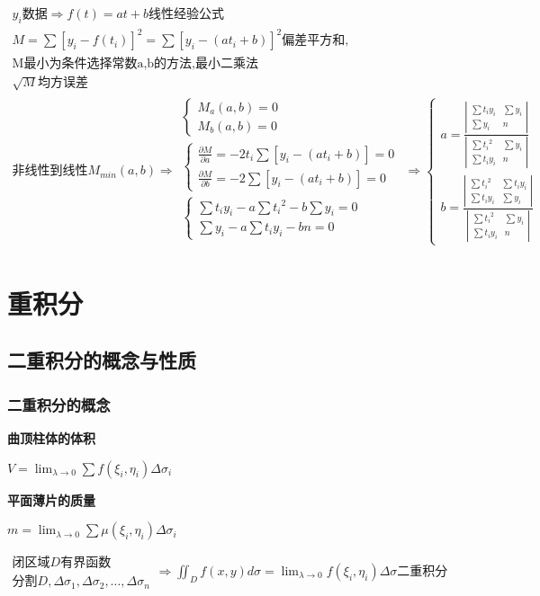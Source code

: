 \documentclass[UTF8]{ctexart}
\newcommand{\mt}[1]{\text{#1}}
\newcommand{\mb}[1]{\textbf{#1}}
\newcommand{\mf}[1]{\left( #1\right)}
\newcommand{\mfc}[1]{\left[ #1 \right]}
\newcommand{\p}{\par}
\newcommand{\ma}[1]{\begin{array}{llll} #1 \end{array}}
\newcommand{\da}[2]{\frac{\partial #1}{\partial #2}}
\newcommand{\fcz}[1] {
    \left\{
        \begin{array}{llll} #1 \end{array}
    \right.
}
\newcommand{\hls}[1] {
    \left|
        \begin{array}{llll} #1 \end{array}
    \right|
}
\begin{document}
$\ma{
y_i \mt{数据} \Rightarrow f\mf{t}=at+b \mt{线性经验公式}\\
M=\sum\mfc{y_i-f\mf{t_i}}^2=\sum\mfc{y_i- \mf{at_i+b }}^2\mt{偏差平方和,}\\
\mt{M最小为条件选择常数a,b的方法,最小二乘法}\\
\sqrt{M}\mt{均方误差}\\
\mt{非线性到线性}
M_{min}\mf{a,b} \Rightarrow  \ma { 
\fcz{
        M_{a}\mf{a,b}=0\\
        M_{b}\mf{a,b}=0
} \\   
\fcz{
    \da{M}{a}=-2t_i\sum\mfc{y_i- \mf{at_i+b} }=0\\
    \da{M}{b}=-2\sum\mfc{y_i- \mf{at_i+b} }=0
} \\   
\fcz{
    \sum t_iy_i-a\sum {t_i}^2-b\sum y_i=0\\
    \sum y_i-a\sum t_iy_i -bn=0
}\\
}\Rightarrow \fcz{
    a=\frac{\hls{
         \sum t_iy_i &  \sum y_i\\
         \sum y_i  & n
    }}{\hls{
         \sum {t_i}^2 &  \sum y_i\\
         \sum t_iy_i  & n
    }} \\
    b=\frac{\hls{
         \sum {t_i}^2 &  \sum t_iy_i\\
         \sum t_iy_i  & \sum y_i
    }}{\hls{
         \sum {t_i}^2 &  \sum y_i\\
         \sum t_iy_i  & n
    }}
}
}$



\newpage
\section{重积分}

\subsection{二重积分的概念与性质}

\subsubsection{二重积分的概念}

\mb{曲顶柱体的体积}\p
$V=\lim_{\lambda \rightarrow 0}\sum f\mf{\xi_i,\eta_i}\Delta \sigma _i$\p

\mb{平面薄片的质量}\p
$m=\lim_{\lambda \rightarrow 0}\sum \mu\mf{\xi_i,\eta_i}\Delta \sigma _i$

$\ma{\mt{闭区域}D\mt{有界函数}\\
\mt{分割}D,\Delta \sigma_1,\Delta \sigma_2,\dots,\Delta \sigma_n
}\Rightarrow   \iint_D  f\mf{x,y}d\sigma=\lim_{\lambda \rightarrow 0}f\mf{\xi_i,\eta_i}\Delta \sigma\mt{二重积分}$\p
\end{document}
